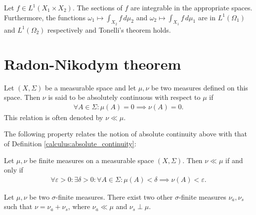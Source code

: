     \begin{result}[Fubini]
        Let $f\in L^1(X_1\times X_2)$. The sections of $f$ are integrable in the appropriate spaces. Furthermore, the functions $\omega_1\mapsto\int_{X_2}f\,d\mu_2$ and $\omega_2\mapsto\int_{X_1}f\,d\mu_1$ are in $L^1(\Omega_1)$ and $L^1(\Omega_2)$ respectively and Tonelli's theorem holds.
    \end{result}

\section{Radon-Nikodym theorem}\label{section:Radon-Nikodym}

    \begin{definition}\label{lebesgue:absolute_continuity}
        Let $(X,\Sigma)$ be a measurable space and let $\mu,\nu$ be two measures defined on this space. Then $\nu$ is said to be absolutely continuous with respect to $\mu$ if
        \begin{gather}
            \forall A\in\Sigma:\mu(A) = 0\implies\nu(A) = 0.
        \end{gather}
        This relation is often denoted by $\nu\ll\mu$.
    \end{definition}

    The following property relates the notion of absolute continuity above with that of Definition \ref{calculus:absolute_continuity}:
    \begin{property}
        Let $\mu,\nu$ be finite measures on a measurable space $(X,\Sigma)$. Then $\nu\ll\mu$ if and only if
        \begin{gather}
            \forall\varepsilon>0:\exists\delta>0:\forall A\in\Sigma:\mu(A)<\delta\implies\nu(A)<\varepsilon.
        \end{gather}
    \end{property}

    \begin{theorem}
        Let $\mu,\nu$ be two $\sigma$-finite measures. There exist two other $\sigma$-finite measures $\nu_a,\nu_s$ such that $\nu=\nu_a+\nu_s$, where $\nu_a\ll\mu$ and $\nu_s\perp\mu$.
    \end{theorem}

